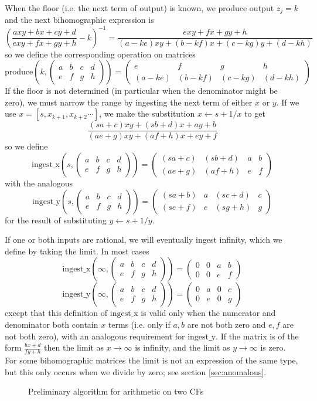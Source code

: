 \documentclass[11pt, oneside]{amsart}   	%
\newcommand{\bihomographic}[8]{\left(\begin{smallmatrix}#1&#2&#3&#4\\#5&#6&#7&#8\end{smallmatrix}\right)}
\newcommand{\abcd}{\left(
\begin{smallmatrix} 
a & b & c & d\\ 
e & f & g & h
\end{smallmatrix}
\right)}
\begin{document}
When the floor (i.e. the next term of output) is known, we produce output $z_j=k$ and the next bihomographic expression is
\[
\left(\frac{axy + bx + cy + d}{exy + fx + gy + h} - k\right)^{-1} = \frac{exy + fx + gy + h}{(a-ke)xy + (b-kf)x + (c-kg)y + (d-kh)}
\]
so we define the corresponding operation on matrices
\[
\mbox{produce}(k, \abcd) = \bihomographic{e}{f}{g}{h}{(a-ke)}{(b-kf)}{(c-kg)}{(d-kh)}
\]
 If the floor is not determined (in particular when the denominator might be zero), we must narrow the range by ingesting the next term of either $x$ or $y$.
 If we use $x = [s,x_{k+1},x_{k+2}\cdots]$, we make the substitution $x \leftarrow s + 1/x$ to get
\[
\frac{(sa+c)xy + (sb+d)x + ay + b}{(ae+g)xy + (af+h)x + ey + f}
\]
so we define
\[
\mbox{ingest\_x}(s, \abcd) = \bihomographic{(sa+c)}{(sb+d)}{a}{b} {(ae+g)}{(af+h)}{e}{f}
\]
with the analogous 
\[
\mbox{ingest\_y}(s, \abcd) = \bihomographic{(sa+b)}{a}{(sc+d)}{c}{(se+f)}{e}{(sg+h)}{g}
\]
for the result of substituting $y \leftarrow s + 1/y$.

If one or both inputs are rational, we will eventually ingest infinity, which we define by taking the limit. In most cases
\[
\mbox{ingest\_x}(\infty, \abcd) = \bihomographic{0}{0}{a}{b} {0}{0}{e}{f}
\]
\[
\mbox{ingest\_y}(\infty, \abcd) = \bihomographic{0}{a}{0}{c}{0}{e}{0}{g}
\]
except that this definition of $\mbox{ingest\_x}$ is valid only when the numerator and denominator both contain $x$ terms
(i.e. only if $a,b$ are not both zero and $e,f$ are not both zero), with an analogous requirement for $\mbox{ingest\_y}$.
If the matrix is of the form $\frac{bx+d}{fy+h}$ then the limit as $x \to \infty$ is infinity, %
and the limit as $y \to \infty$  is zero. 
For some bihomographic matrices the limit is not an expression of the same type, but this only occurs when we divide by zero; see section \ref{sec:anomalous}.

\begin{figure}\label{fig:twoCFarithPrelim}
\begin{algorithmic}
 
 
\STATE{$M \gets \abcd$} 
           \ENDWHILE
\ENDWHILE
\end{algorithmic}
\caption{Preliminary algorithm for arithmetic on two CFs}
\end{figure}
\end{document}
